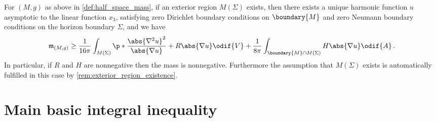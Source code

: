 \documentclass[titlepage,numbers=noenddot,oneside,%
cleardoublepage=empty,paper=a4,fontsize=11pt,%
english,%
]{scrartcl}
\newcommand*{\mathfullstop}{\,.}
\newcommand{\mass}[2]{\mathfrak{m}_{(#1,#2)}} %
\begin{document}
\begin{theorem}\label{thm:main_result}
    For \( (M,g) \) as above in \cref{def:half_space_mass}, if an exterior region \( M(\Sigma) \) exists, then
    there exists a unique harmonic function \( u \) asymptotic to the linear function \( x_3 \), satisfying zero Dirichlet boundary conditions on \( \boundary{M} \) and zero Neumann boundary conditions on the horizon boundary \( \Sigma \), and we have
    \begin{equation}
        \mass{M}{g}\geq \frac{1}{16\pi}\int_{M(\Sigma)}\p*{\frac{\abs{\nabla^2 u}^2}{\abs{\nabla u}}+R\abs{\nabla u}}\odif{V}+\frac{1}{8\pi}\int_{\boundary{M}\cap M(\Sigma)}H \abs{\nabla u}\odif{A}\mathfullstop\label{eq:main_result}
    \end{equation} 
    In particular, if \( R \) and \( H \) are nonnegative then the mass is nonnegative. Furthermore the assumption that \( M(\Sigma) \) exists is automatically fulfilled in this case by \cref{rem:exterior_region_existence}.
\end{theorem} 



\section{Main basic integral inequality}
\end{document}
